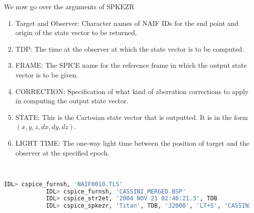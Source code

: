 \documentclass[crop=false,class=article,oneside]{standalone}
\begin{document}
            We now go over the arguments of SPKEZR
            \begin{enumerate}
                \item Target and Observer: Character names of NAIF IDs for the end point and origin of the state vector to be returned.
                \item TDP: The time at the observer at which the state vector is to be computed.
                \item FRAME: The SPICE name for the reference frame in which the output state vector is to be given.
                \item CORRECTION: Specification of what kind of aberration corrections to apply in computing the output state vector.
                \item STATE: This is the Cartesian state vector that is outputted. It is in the form $(x,y,z,dx,dy,dz)$. 
                \item LIGHT TIME: The one-way light time between the position of target and the observer at the specified epoch.
            \end{enumerate}
            \begin{example}
            \
            \begin{lstlisting}[language=bash,basicstyle=\footnotesize]
            IDL> cspice_furnsh, 'NAIF0010.TLS'
            IDL> cspice_furnsh, 'CASSINI_MERGED.BSP'
            IDL> cspice_str2et, '2004 NOV 21 02:40:21.3', TDB
            IDL> cspice_spkezr, 'Titan', TDB, 'J2000', 'LT+S', 'CASSINI', STATE, LT
            \end{lstlisting}
            \end{example}
\end{document}
